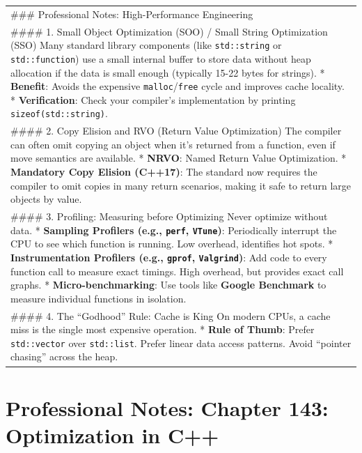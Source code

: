 \begin{longtable}[]{@{}
  >{\raggedright\arraybackslash}p{}@{}}
\toprule
\endhead
\#\#\# Professional Notes: High-Performance Engineering \\
\#\#\#\# 1. Small Object Optimization (SOO) / Small String Optimization
(SSO) Many standard library components (like
\passthrough{\lstinline!std::string!} or
\passthrough{\lstinline!std::function!}) use a small internal buffer to
store data without heap allocation if the data is small enough
(typically 15-22 bytes for strings). * \textbf{Benefit}: Avoids the
expensive
\passthrough{\lstinline!malloc!}/\passthrough{\lstinline!free!} cycle
and improves cache locality. * \textbf{Verification}: Check your
compiler's implementation by printing
\passthrough{\lstinline!sizeof(std::string)!}. \\
\#\#\#\# 2. Copy Elision and RVO (Return Value Optimization) The
compiler can often omit copying an object when it's returned from a
function, even if move semantics are available. * \textbf{NRVO}: Named
Return Value Optimization. * \textbf{Mandatory Copy Elision (C++17)}:
The standard now requires the compiler to omit copies in many return
scenarios, making it safe to return large objects by value. \\
\#\#\#\# 3. Profiling: Measuring before Optimizing Never optimize
without data. * \textbf{Sampling Profilers (e.g.,
\passthrough{\lstinline!perf!}, \passthrough{\lstinline!VTune!})}:
Periodically interrupt the CPU to see which function is running. Low
overhead, identifies hot spots. * \textbf{Instrumentation Profilers
(e.g., \passthrough{\lstinline!gprof!},
\passthrough{\lstinline!Valgrind!})}: Add code to every function call to
measure exact timings. High overhead, but provides exact call graphs. *
\textbf{Micro-benchmarking}: Use tools like \textbf{Google Benchmark} to
measure individual functions in isolation. \\
\#\#\#\# 4. The ``Godhood'' Rule: Cache is King On modern CPUs, a cache
miss is the single most expensive operation. * \textbf{Rule of Thumb}:
Prefer \passthrough{\lstinline!std::vector!} over
\passthrough{\lstinline!std::list!}. Prefer linear data access patterns.
Avoid ``pointer chasing'' across the heap. \\
\bottomrule
\end{longtable}

\hypertarget{professional-notes-chapter-143-optimization-in-c}{%
\section{Professional Notes: Chapter 143: Optimization in
C++}\label{professional-notes-chapter-143-optimization-in-c}}


